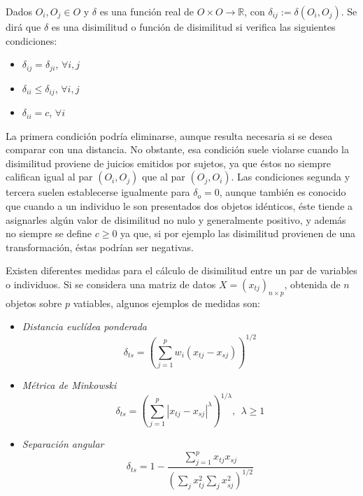 \documentclass[12pt,oneside]{book}\usepackage[]{graphicx}\usepackage[]{color}
\theoremstyle{definition} %
\begin{document}
\begin{defin}
Dados $O_i, O_j \in O$ y $\delta$ es una función real de $O \times O \rightarrow \mathbb{R}$, con $\delta_{ij}:=\delta(O_i,O_j)$. Se dirá que $\delta$ es una disimilitud o función de disimilitud si verifica las siguientes condiciones:
\begin{itemize}
\item $\delta_{ij}=\delta_{ji}$, $\forall i,j$
\item $\delta_{ii} \leq \delta_{ij}$, $\forall i,j$
\item $\delta_{ii}= c$, $\forall i$
\end{itemize}
\end{defin}

La primera condición podría eliminarse, aunque resulta necesaria si se desea comparar con una distancia. No obstante, esa condición suele violarse cuando la disimilitud proviene de juicios emitidos por sujetos, ya que éstos no siempre califican igual al par $(O_i,O_j)$ que al par $(O_j,O_i)$. Las condiciones segunda y tercera suelen establecerse igualmente para $\delta_o=0$, aunque también es conocido que cuando a un individuo le son presentados dos objetos idénticos, éste tiende a asignarles algún valor de disimilitud no nulo y generalmente positivo, y además no siempre se define $c \geq 0$ ya que, si por ejemplo las disimilitud provienen de una transformación, éstas podrían ser negativas.

Existen diferentes medidas para el cálculo de disimilitud entre un par de variables o individuos. Si se considera una matriz de datos $X=(x_{tj})_{n\times p}$, obtenida de $n$ objetos sobre $p$ vatiables, algunos ejemplos de medidas son:

\begin{itemize}
\item \textit{Distancia euclídea ponderada}
$$ \delta_{ts}=\left(\displaystyle \sum_{j=1}^p w_i(x_{tj}-x_{sj}) \right)^{1/2} $$
\item \textit{Métrica de Minkowski}
$$ \delta_{ts}=\left(\displaystyle \sum_{j=1}^p |x_{tj}-x_{sj}|^{\lambda}\right)^{1/\lambda}, \ \ \lambda \geq 1 $$
\item \textit{Separación angular}
$$ \delta_{ts}=1-\frac{\sum_{j=1}^p x_{tj}x_{sj}}{(\sum_j x_{tj}^2 \sum_j x_{sj}^2)^{1/2}} $$

\end{itemize}
\end{document}
